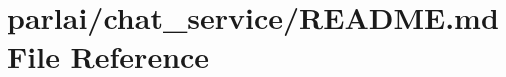 \hypertarget{parlai_2chat__service_2README_8md}{}\section{parlai/chat\+\_\+service/\+R\+E\+A\+D\+ME.md File Reference}
\label{parlai_2chat__service_2README_8md}
